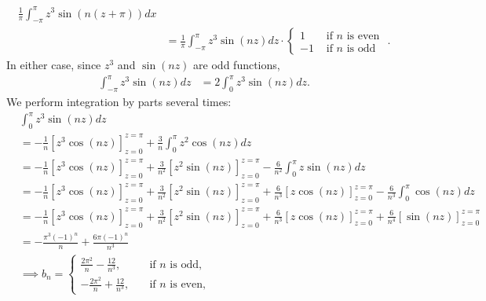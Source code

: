 \documentclass[11pt]{article}
\begin{document}
\begin{solution}
\begin{itemize}
\begin{align*}
        \frac{1}{\pi} \int_{-\pi}^{\pi} z^{3} \sin(n(z+\pi)) dx
        \\&=
        \frac{1}{\pi} \int_{-\pi}^{\pi} z^{3} \sin(nz) dz
        \cdot \left\{\begin{array}{ll} 1 & \text{ if $n$ is even } \\ -1 & \text{ if $n$ is odd } \end{array}\right.
        .
    \end{align*}
    In either case, since $z^3$ and $\sin(nz)$ are odd functions,
    \begin{align*}
        \int_{-\pi}^{\pi} z^{3} \sin(nz) dz
        &=
        2\int_{0}^{\pi} z^{3} \sin(nz) dz
        .
    \end{align*}
    We perform integration by parts several times:
    \begin{align*}
        &
        \int_{0}^{\pi} z^{3} \sin(nz) dz
        \\&=
        -
        \frac 1 {n} 
        \left[ z^{3} \cos(nz) \right]_{z=0}^{z=\pi}
        +
        \frac 3 {n}
        \int_{0}^{\pi} z^{2} \cos(nz) dz
        \\&=
        -
        \frac 1 {n} 
        \left[ z^{3} \cos(nz) \right]_{z=0}^{z=\pi}
        +
        \frac 3 {n^2} 
        \left[ z^{2} \sin(nz) \right]_{z=0}^{z=\pi}
        -
        \frac 6 {n^2} 
        \int_{0}^{\pi} z \sin(nz) dz
        \\&=
        - \frac 1 {n} 
        \left[ z^{3} \cos(nz) \right]_{z=0}^{z=\pi}
        + 
        \frac 3 {n^2}
        \left[ z^{2} \sin(nz) \right]_{z=0}^{z=\pi}
        +
        \frac 6 {n^3} 
        \left[ z \cos(nz) \right]_{z=0}^{z=\pi}
        -
        \frac 6 {n^3} 
        \int_{0}^{\pi} \cos(nz) dz
        \\&=
        - \frac 1 {n} 
        \left[ z^{3} \cos(nz) \right]_{z=0}^{z=\pi}
        + 
        \frac 3 {n^2}
        \left[ z^{2} \sin(nz) \right]_{z=0}^{z=\pi}
        +
        \frac 6 {n^3} 
        \left[ z \cos(nz) \right]_{z=0}^{z=\pi}
        +
        \frac 6 {n^4} 
        \left[ \sin(nz) \right]_{z=0}^{z=\pi}
        \\&=
	-\frac{\pi^3(-1)^n}{n}+\frac{6\pi(-1)^n}{n^3} 
	\\&\implies
            b_n = 
            \begin{cases}
            \frac{2\pi^2}{n}-\frac{12}{n^3}  ,\quad &\text{if } n\text{ is odd,}\\
            -\frac{2\pi^2}{n}+\frac{12}{n^3}   ,\quad &\text{if } n\text{ is even,}

\end{cases}
\end{align*}
\end{itemize}
\end{solution}
\end{document}

